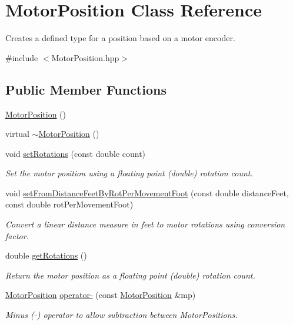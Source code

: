 \hypertarget{classMotorPosition}{\section{Motor\-Position Class Reference}
\label{classMotorPosition}
}


Creates a defined type for a position based on a motor encoder.  




{\ttfamily \#include $<$Motor\-Position.\-hpp$>$}

\subsection*{Public Member Functions}
\begin{DoxyCompactItemize}
\item 
\hyperlink{classMotorPosition_aff0b57531330258354815c98c21ccf22}{Motor\-Position} ()
\item 
virtual \hyperlink{classMotorPosition_a63f9a5f064dedeee8d54c19a07e3afd9}{$\sim$\-Motor\-Position} ()
\item 
void \hyperlink{classMotorPosition_aafd35469ff1364e2d7db6704c79af9b8}{set\-Rotations} (const double count)
\begin{DoxyCompactList}\small\item\em Set the motor position using a floating point (double) rotation count. \end{DoxyCompactList}\item 
void \hyperlink{classMotorPosition_a9b0f13dd755deb8bda8069b7c5eda11e}{set\-From\-Distance\-Feet\-By\-Rot\-Per\-Movement\-Foot} (const double distance\-Feet, const double rot\-Per\-Movement\-Foot)
\begin{DoxyCompactList}\small\item\em Convert a linear distance measure in feet to motor rotations using conversion factor. \end{DoxyCompactList}\item 
double \hyperlink{classMotorPosition_aff33869a933accaca983110601151ddf}{get\-Rotations} ()
\begin{DoxyCompactList}\small\item\em Return the motor position as a floating point (double) rotation count. \end{DoxyCompactList}\item 
\hyperlink{classMotorPosition}{Motor\-Position} \hyperlink{classMotorPosition_a32b180c8c51be1a15c46ecc3e216325f}{operator-\/} (const \hyperlink{classMotorPosition}{Motor\-Position} \&mp)
\begin{DoxyCompactList}\small\item\em Minus (-\/) operator to allow subtraction between Motor\-Positions. \end{DoxyCompactList}\end{DoxyCompactItemize}
